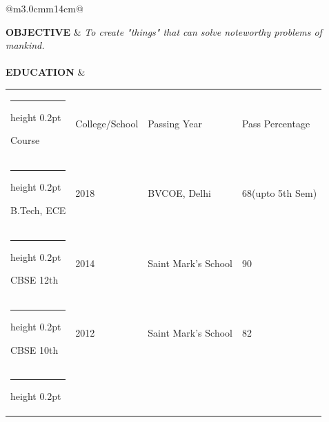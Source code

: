 \documentclass[a4paper]{article}
\makeatletter
\newcommand{\thinhline}
{
	\noalign {\ifnum 0=`}\fi \hrule height 0.2pt
	\futurelet \reserved@a \@xhline
}
\makeatother
\begin{document}
		\begin{longtable}{@{}m{3.0cm}m{14cm}@{}}
		
			\textrm{\textbf {OBJECTIVE}} & \textit{To create "things" that can solve noteworthy problems of mankind.}
			\\ \\
					
		
			\textrm{\textbf {EDUCATION}} & 
				\begin{center}
					\begin{tabular}{ |m{4cm}| m{4cm}| m{2cm}| m{3cm}| }
						\thinhline
						{\begin{center} Course \end{center}} & {\begin{center} 
						College/School \end{center}} & {\begin{center} Passing Year \end{center}} 
						& {\begin{center} Pass Percentage \end{center}} \\
						\thinhline
    					B.Tech,  ECE & 2018 & BVCOE, Delhi  & 68(upto 5th Sem)\\ 
		    			\thinhline
    					CBSE 12th & {2014} & Saint Mark's School & 90\\
    					\thinhline
		    			CBSE 10th & 2012 & Saint Mark's School & 82\\
    					\thinhline
  					\end{tabular}
				\end{center}
			\\ \\
			

\end{longtable}
\end{document}
